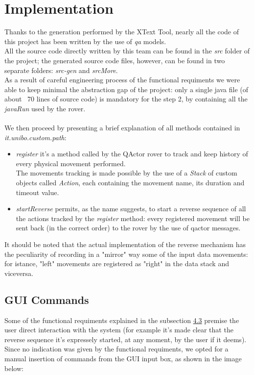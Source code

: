 \documentclass{llncs}
\newcommand{\labelsec}[1]{\label{sec:#1}}
\begin{document}
\section{Implementation}
\labelsec{Implementation}
Thanks to the generation performed by the XText Tool, nearly all the code of this project has been written by the use of \textit{qa} models.\\
All the source code directly written by this team can be found in the \textit{src} folder of the project; the generated source code files, however, can be found in two separate folders: \textit{src-gen} and \textit{srcMore}.\\
As a result of careful engineering process of the functional requiments we were able to keep minimal the abstraction gap of the project: only a single java file (of about ~70 lines of source code) is mandatory for the step 2, by containing all the \textit{javaRun} used by the rover.\\\\
We then proceed by presenting a brief explanation of all methods contained in \textit{it.unibo.custom.path}:
\begin{itemize}
\item \textit{register} it's a method called by the QActor rover to track and keep history of every physical movement performed.\\
The movements tracking is made possible by the use of a \textit{Stack} of custom objects called \textit{Action}, each containing the movement name, its duration and timeout value.\\
\item \textit{startReverse} permits, as the name suggests, to start a reverse sequence of all the actions tracked by the \textit{register} method: every registered movement will be sent back (in the correct order) to the rover by the use of qactor messages.
\end{itemize}
It should be noted that the actual implementation of the reverse mechanism has the peculiarity of recording in a "mirror" way some of the input data movements: for istance, "left" movements are registered as "right" in the data stack and viceversa.
\newpage
\subsection{GUI Commands}
Some of the functional requiments explained in the subsection \hyperref[sec:Functional requiments]{4.3} premise the user direct interaction with the system (for example it's made clear that the reverse sequence it's expressely started, at any moment, by the user if it deems).\\
Since no indication was given by the functional requiments, we opted for a \\manual insertion of commands from the GUI input box, as shown in the image below:\\
\end{document}
